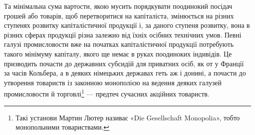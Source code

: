 Та мінімальна сума вартости, якою мусить порядкувати поодинокий
посідач грошей або товарів, щоб перетворитися на капіталіста,
змінюється на різних ступенях розвитку капіталістичної
продукції і, за даного ступеня розвитку, вона в різних сферах
продукції різна залежно від їхніх осібних технічних умов. Певні
галузі промисловости вже на початках капіталістичної продукції
потребують такого мінімуму капіталу, якого ще немає в руках
поодиноких індивідів. Це призводить почасти до державних субсидій
для приватних осіб, як от у Франції за часів Кольбера, а в
деяких німецьких державах геть аж і донині, а почасти до утворення
товариств із законною монополією на ведення деяких
галузей промисловости й торговлі\footnote{
Такі установи Мартин Лютер називає «Die Gesellschaft Monopolia»,
тобто монопольними товариствами.
} — предтеч сучасних акційних товариств.
